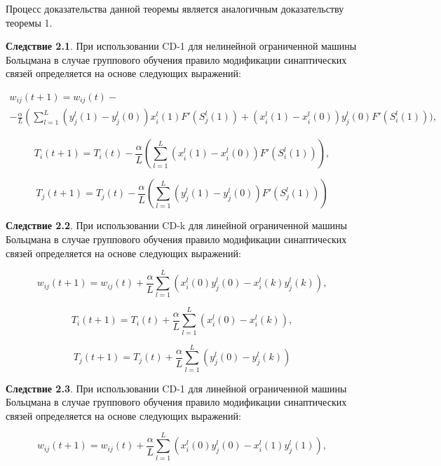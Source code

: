 Процесс доказательства данной теоремы является аналогичным доказательству теоремы 1.

\textbf{Следствие 2.1}. При использовании  CD-1 для нелинейной ограниченной машины Больцмана в случае группового обучения правило модификации синаптических связей определяется на основе следующих выражений:

\begin{multline*}
    w_{ij}(t+1)=w_{ij}(t)-\\-\frac{\alpha}{L}\left(\sum_{l=1}^L (y_j^l(1)-y_j^l(0))x_i^l(1)F'(S_j^l(1))+(x_i^l(1)-x_i^l(0))y_j^l(0)F'(S_i^l(1))\Bigg)\right.,
\end{multline*}

\begin{equation*}
    T_i(t+1)=T_i(t)-\frac{\alpha}{L}\left(\sum_{l=1}^L (x_i^l(1)-x_i^l(0))F'(S_i^l(1))\right),
\end{equation*}

\begin{equation*}
    T_j(t+1)=T_j(t)-\frac{\alpha}{L}\left(\sum_{l=1}^L (y_j^l(1)-y_j^l(0))F'(S_j^l(1))\right)
\end{equation*}

\textbf{Следствие 2.2}. При использовании  CD-k для линейной ограниченной машины Больцмана в случае группового обучения правило модификации синаптических связей определяется на основе следующих выражений:

\begin{equation*}
    w_{ij}(t+1)=w_{ij}(t)+\frac{\alpha}{L}\sum_{l=1}^L (x_i^l(0)y_j^l(0)-x_i^l(k)y_j^l(k)),
\end{equation*}

\begin{equation*}
    T_{i}(t+1)=T_{i}(t)+\frac{\alpha}{L}\sum_{l=1}^L (x_i^l(0)-x_i^l(k)),
\end{equation*}

\begin{equation*}
    T_{j}(t+1)=T_{j}(t)+\frac{\alpha}{L}\sum_{l=1}^L (y_j^l(0)-y_j^l(k))
\end{equation*}

\textbf{Следствие 2.3}. При использовании  CD-1 для линейной ограниченной машины Больцмана в случае группового обучения правило модификации синаптических связей определяется на основе следующих выражений:

\begin{equation*}
    w_{ij}(t+1)=w_{ij}(t)+\frac{\alpha}{L}\sum_{l=1}^L (x_i^l(0)y_j^l(0)-x_i^l(1)y_j^l(1)),
\end{equation*}

